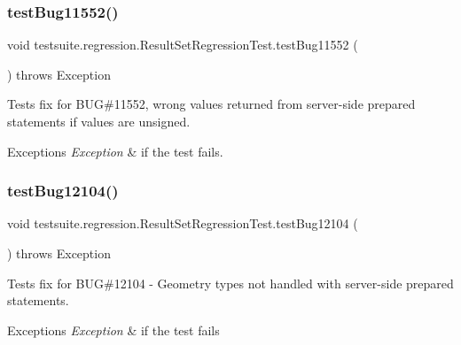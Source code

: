 \subsubsection{\texorpdfstring{test\+Bug11552()}{testBug11552()}}
{\footnotesize\ttfamily void testsuite.\+regression.\+Result\+Set\+Regression\+Test.\+test\+Bug11552 (\begin{DoxyParamCaption}{ }\end{DoxyParamCaption}) throws Exception}

Tests fix for B\+UG\#11552, wrong values returned from server-\/side prepared statements if values are unsigned.


\begin{DoxyExceptions}{Exceptions}
{\em Exception} & if the test fails. \\
\hline
\end{DoxyExceptions}
\mbox{\label{classtestsuite_1_1regression_1_1_result_set_regression_test_a5967a08c14eff5f2158876c10b97da26}} 
\subsubsection{\texorpdfstring{test\+Bug12104()}{testBug12104()}}
{\footnotesize\ttfamily void testsuite.\+regression.\+Result\+Set\+Regression\+Test.\+test\+Bug12104 (\begin{DoxyParamCaption}{ }\end{DoxyParamCaption}) throws Exception}

Tests fix for B\+UG\#12104 -\/ Geometry types not handled with server-\/side prepared statements.


\begin{DoxyExceptions}{Exceptions}
{\em Exception} & if the test fails \\
\hline
\end{DoxyExceptions}
\mbox{\label{classtestsuite_1_1regression_1_1_result_set_regression_test_ac1d2232b96f37d2f6ce4fbf52264cff8}} 

